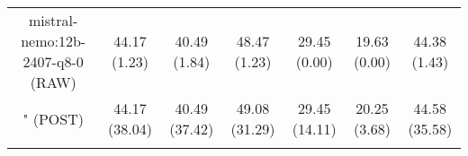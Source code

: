 \begin{table}[]
{\begin{tabular}{ccccccc}
        \multicolumn{1}{c|}{mistral-nemo:12b-2407-q8-0 (RAW)} & 44.17 (1.23) & 40.49 (1.84) & \multicolumn{1}{c|}{48.47 (1.23)} & 29.45 (0.00) & \multicolumn{1}{c|}{19.63 (0.00)} & 44.38 (1.43) \\
        
        

        \multicolumn{1}{c|}{" (POST)} & 44.17 (38.04) & 40.49 (37.42) & \multicolumn{1}{c|}{49.08 (31.29)} & 29.45 (14.11) & \multicolumn{1}{c|}{20.25 (3.68)} & 44.58 (35.58) \\
        \cline{1-7}
        
\\ \hline
\end{tabular}%
}
\end{table}
    